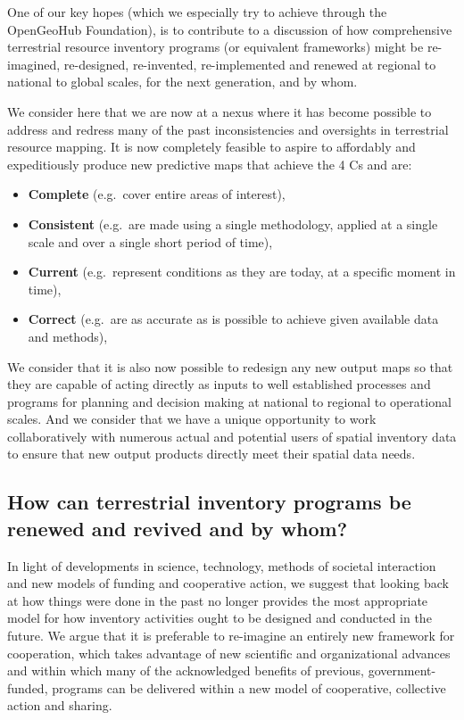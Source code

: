 \documentclass[graybox,natbib,nospthms,UStrade]{svmono}
\begin{document}
One of our key hopes (which we especially try to achieve through the OpenGeoHub
Foundation), is to contribute to a discussion of how comprehensive
terrestrial resource inventory programs (or equivalent frameworks) might
be re-imagined, re-designed, re-invented, re-implemented and renewed at
regional to national to global scales, for the next generation, and by
whom.

We consider here that we are now at a nexus where it has become possible
to address and redress many of the past inconsistencies and oversights
in terrestrial resource mapping. It is now completely feasible to aspire
to affordably and expeditiously produce new predictive maps that achieve
the 4 Cs and are:

\begin{itemize}
\item
  \textbf{Complete} (e.g.~cover entire areas of interest),
\item
  \textbf{Consistent} (e.g.~are made using a single methodology, applied at a
  single scale and over a single short period of time),
\item
  \textbf{Current} (e.g.~represent conditions as they are today, at a specific
  moment in time),
\item
  \textbf{Correct} (e.g.~are as accurate as is possible to achieve given
  available data and methods),
\end{itemize}

We consider that it is also now possible to redesign any new output maps
so that they are capable of acting directly as inputs to well
established processes and programs for planning and decision making at
national to regional to operational scales. And we consider that we have
a unique opportunity to work collaboratively with numerous actual and
potential users of spatial inventory data to ensure that new output
products directly meet their spatial data needs.

\hypertarget{how-can-terrestrial-inventory-programs-be-renewed-and-revived-and-by-whom}{%
\subsection{How can terrestrial inventory programs be renewed and revived and by whom?}\label{how-can-terrestrial-inventory-programs-be-renewed-and-revived-and-by-whom}}

In light of developments in science, technology, methods of societal
interaction and new models of funding and cooperative action, we suggest
that looking back at how things were done in the past no longer provides
the most appropriate model for how inventory activities ought to be
designed and conducted in the future. We argue that it is preferable to
re-imagine an entirely new framework for cooperation, which takes
advantage of new scientific and organizational advances and within which
many of the acknowledged benefits of previous, government-funded,
programs can be delivered within a new model of cooperative, collective
action and sharing.
\end{document}
